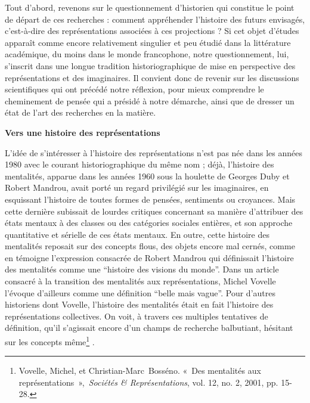 \documentclass[letterpaper,portrait,12pt]{article}
\begin{document}
	Tout d'abord, revenons sur le questionnement d'historien qui constitue le point de d\'{e}part de ces recherches : comment appr\'{e}hender l'histoire des futurs envisag\'{e}s, c'est-\`{a}-dire des repr\'{e}sentations associ\'{e}es \`{a} ces projections ? Si cet objet d'\'{e}tudes appara\^{i}t comme encore relativement singulier et peu \'{e}tudi\'{e} dans la litt\'{e}rature acad\'{e}mique, du moins dans le monde francophone, notre questionnement, lui, s'inscrit dans une longue tradition historiographique de mise en perspective des repr\'{e}sentations et des imaginaires. Il convient donc de revenir sur les discussions scientifiques qui ont pr\'{e}c\'{e}d\'{e} notre r\'{e}flexion, pour mieux comprendre le cheminement de pens\'{e}e qui a pr\'{e}sid\'{e} \`{a} notre d\'{e}marche, ainsi que de dresser un \'{e}tat de l'art des recherches en la mati\`{e}re.








\textbf{	Vers une histoire des repr\'{e}sentations}





	L'id\'{e}e de s'int\'{e}resser \`{a} l'histoire des repr\'{e}sentations n'est pas n\'{e}e dans les ann\'{e}es 1980 avec le courant historiographique du m\^{e}me nom ; d\'{e}j\`{a}, l'histoire des mentalit\'{e}s, apparue dans les ann\'{e}es 1960 sous la houlette de Georges Duby et Robert Mandrou, avait port\'{e} un regard privil\'{e}gi\'{e} sur les imaginaires, en esquissant l'histoire de toutes formes de pens\'{e}es, sentiments ou croyances. Mais cette derni\`{e}re subissait de lourdes critiques concernant sa mani\`{e}re d'attribuer des \'{e}tats mentaux \`{a} des classes ou des cat\'{e}gories sociales enti\`{e}res, et son approche quantitative et s\'{e}rielle de ces \'{e}tats mentaux. En outre, cette histoire des mentalit\'{e}s reposait sur des concepts flous, des objets encore mal cern\'{e}s, comme en t\'{e}moigne l'expression consacr\'{e}e de Robert Mandrou qui d\'{e}finissait l'histoire des mentalit\'{e}s comme une {``}histoire des visions du monde''. Dans un article consacr\'{e} \`{a} la transition des mentalit\'{e}s aux repr\'{e}sentations, Michel Vovelle l'\'{e}voque d'ailleurs comme une d\'{e}finition {``}belle mais vague''. Pour d'autres historiens dont Vovelle, l'histoire des mentalit\'{e}s \'{e}tait en fait l'histoire des repr\'{e}sentations collectives. On voit, \`{a} travers ces multiples tentatives de d\'{e}finition, qu'il s'agissait encore d'un champs de recherche balbutiant, h\'{e}sitant sur les concepts m\^{e}me\footnote{	 Vovelle, Michel, et Christian-Marc Boss\'{e}no. « Des mentalit\'{e}s aux repr\'{e}sentations », \emph{Soci\'{e}t\'{e}s \& Repr\'{e}sentations}, vol. 12, no. 2, 2001, pp. 15-28.} . 
\end{document}
